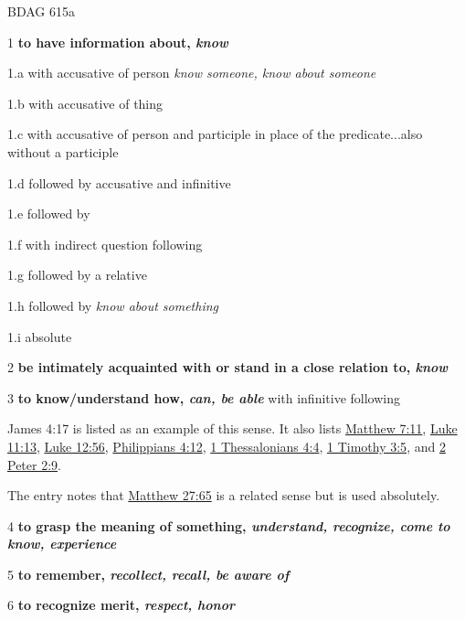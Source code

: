 				\begin{compactdesc}
					\item[BDAG 615a] \textbf{}
						\begin{compactitem}
							\item[1] \textbf{to have information about, \textit{know}}
							\item[1.a] with accusative of person \textit{know someone, know about someone}
							\item[1.b] with accusative of thing
							\item[1.c] with accusative of person and participle in place of the predicate...also without a participle
							\item[1.d] followed by accusative and infinitive
							\item[1.e] followed by 
							\item[1.f] with indirect question following
							\item[1.g] followed by a relative
							\item[1.h] followed by  \textit{know about something}
							\item[1.i] absolute
							\item[2] \textbf{be intimately acquainted with or stand in a close relation to, \textit{know}}
							\item[3] \textbf{to know/understand how, \textit{can, be able}} with infinitive following
								\begin{compactitem}
									\item James 4:17 is listed as an example of this sense. It also lists \hyperref[MATTHEW-7-11]{Matthew 7:11}, \hyperref[LUKE-11-13]{Luke 11:13}, \hyperref[LUKE-12-56]{Luke 12:56}, \hyperref[PHILIPPIANS-4-12]{Philippians 4:12}, \hyperref[1THESSALONIANS-4-4]{1 Thessalonians 4:4}, \hyperref[1TIMOTHY-3-5]{1 Timothy 3:5}, and \hyperref[2PETER-2-9]{2 Peter 2:9}.
									\item The entry notes that \hyperref[MATTHEW-27-65]{Matthew 27:65} is a related sense but is used absolutely.
								\end{compactitem}
							\item[4] \textbf{to grasp the meaning of something, \textit{understand, recognize, come to know, experience}}
							\item[5] \textbf{to remember, \textit{recollect, recall, be aware of}}
							\item[6] \textbf{to recognize merit, \textit{respect, honor}}
								\begin{compactitem}

\end{compactitem}
\end{compactitem}
\end{compactdesc}
